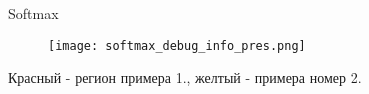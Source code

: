 
\begin{frame}{Softmax}
\begin{figure}
\centering
\texttt{[image: softmax\_debug\_info\_pres.png]}
\end{figure}
    Красный - регион примера 1., желтый - примера номер 2.
\end{frame}